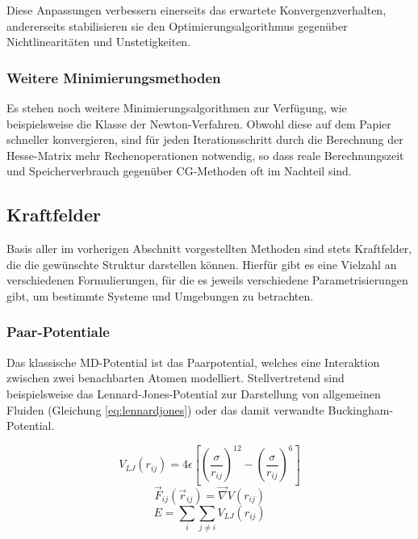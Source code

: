 Diese Anpassungen verbessern einerseits das erwartete Konvergenzverhalten, andererseits stabilisieren sie den Optimierungsalgorithmus gegenüber Nichtlinearitäten und Unstetigkeiten.

\subsubsection{Weitere Minimierungsmethoden}

Es stehen noch weitere Minimierungsalgorithmen zur Verfügung, wie beispielsweise die Klasse der Newton-Verfahren.
Obwohl diese auf dem Papier schneller konvergieren, sind für jeden Iterationsschritt durch die Berechnung der Hesse-Matrix mehr Rechenoperationen notwendig, so dass reale Berechnungszeit und Speicherverbrauch gegenüber CG-Methoden oft im Nachteil sind.

\subsection{Kraftfelder}

Basis aller im vorherigen Abschnitt vorgestellten Methoden sind stets Kraftfelder, die die gewünschte Struktur darstellen können.
Hierfür gibt es eine Vielzahl an verschiedenen Formulierungen, für die es jeweils verschiedene Parametrisierungen gibt, um bestimmte Systeme und Umgebungen zu betrachten.

\subsubsection{Paar-Potentiale}


Das klassische MD-Potential ist das Paarpotential, welches eine Interaktion zwischen zwei benachbarten Atomen modelliert.
Stellvertretend sind beispielsweise das Lennard-Jones-Potential zur Darstellung von allgemeinen Fluiden (Gleichung \ref{eq:lennardjones}) oder das damit verwandte Bucking\-ham-Potential.

\begin{equation}
  \label{eq:lennardjones}
  V_{LJ}(r_{ij}) = 4 \epsilon \left[\left(\frac{\sigma}{r_{ij}}\right)^{12} - \left(\frac{\sigma}{r_{ij}}\right)^{6}\right]
\end{equation}
\begin{equation}
  \label{eq:pairforce}
  \vec F_{ij}(\vec r_{ij}) = \vec\nabla V(r_{ij})
\end{equation}
\begin{equation}
  \label{eq:pairenergy}
  E = \sum_i\sum_{j \neq i}{V_{LJ}\left(r_{ij}\right)}
\end{equation}

